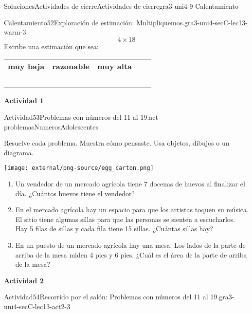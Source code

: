 \documentclass[twoside,10pt,]{article}
\newcommand{\tabularfont}{\relax}
\newcommand{\hrulethin}  {\noalign{\hrule height 0.04em}}
\begin{document}
\begin{solutions-section}{Soluciones}{Actividades de cierre}{}{Actividades de cierre}{}{}{gra3-uni4-9}
{\space\textperiodcentered\space{}Calentamiento}
\begin{explorationsolution}{Calentamiento}{52}{Exploración de estimación: Multipliquemos.}{gra3-uni4-secC-lec13-warm-3}%
%
\begin{equation*}
4\times 18
\end{equation*}
Escribe una estimación que sea:%
\begin{center}%
{\tabularfont%
\begin{tabular}{lAlAl}
{\bfseries{}muy baja}&{\bfseries{}razonable}&{\bfseries{}muy alta}\tabularnewline\hrulethin
~&~&~
\end{tabular}
}%
\end{center}%
\end{explorationsolution}%
\par\medskip
\noindent\textbf{\large{}\space\textperiodcentered\space{}Actividad 1}
\begin{activitysolution}{Actividad}{53}{Problemas con números del 11 al 19.}{act-problemasNumerosAdolescentes}%
\begin{sidebyside}{2}{0.05}{0.05}{0.1}%
\begin{sbspanel}{0.5}%
Resuelve cada problema. Muestra cómo pensaste. Usa objetos, dibujos o un diagrama.%
\end{sbspanel}%
\begin{sbspanel}{0.3}%
\texttt{[image: external/png-source/egg\_carton.png]}
\end{sbspanel}%
\end{sidebyside}%
%
\begin{enumerate}
\item{}Un vendedor de un mercado agrícola tiene 7 docenas de huevos al finalizar el día. ¿Cuántos huevos tiene el vendedor?%
\item{}En el mercado agrícola hay un espacio para que los artistas toquen su música. El sitio tiene algunas sillas para que las personas se sienten a escucharlos. Hay 5 filas de sillas y cada fila tiene 15 sillas. ¿Cuántas sillas hay?%
\item{}En un puesto de un mercado agrícola hay una mesa. Los lados de la parte de arriba de la mesa miden 4 pies y 6 pies. ¿Cuál es el área de la parte de arriba de la mesa?%
\end{enumerate}
\end{activitysolution}%
\par\medskip
\noindent\textbf{\large{}\space\textperiodcentered\space{}Actividad 2}
\begin{activitysolution}{Actividad}{54}{Recorrido por el salón: Problemas con números del 11 al 19.}{gra3-uni4-secC-lec13-act2-3}%

\end{activitysolution}
\end{solutions-section}
\end{document}
